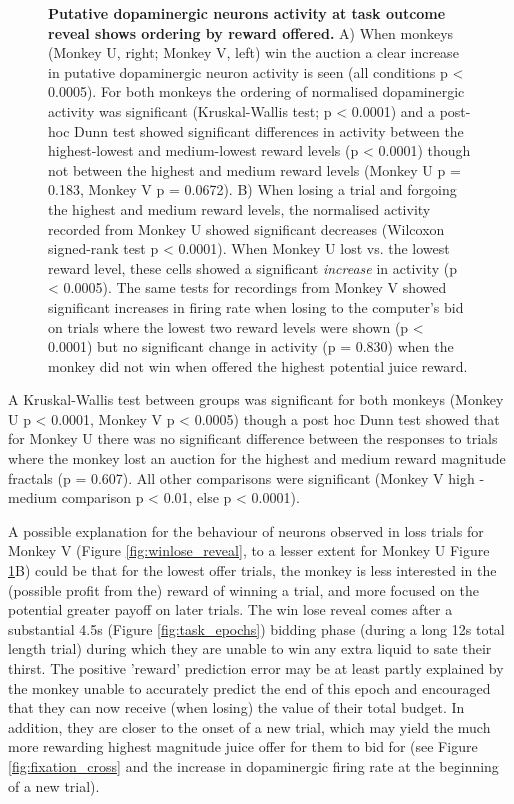 \begin{figure}[p] 
\centering    

\caption[Putative dopaminergic neurons activity at task outcome reveal shows ordering by reward offered.]{\textbf{Putative dopaminergic neurons activity at task outcome reveal shows ordering by reward offered.} A) When monkeys (Monkey U, right; Monkey V, left) win the auction a clear increase in putative dopaminergic neuron activity is seen (all conditions p < 0.0005). For both monkeys the ordering of normalised dopaminergic activity was significant (Kruskal-Wallis test; p < 0.0001) and a post-hoc Dunn test showed significant differences in activity between the highest-lowest and medium-lowest reward levels (p < 0.0001) though not between the highest and medium reward levels (Monkey U p = 0.183, Monkey V p = 0.0672). B) When losing a trial and forgoing the highest and medium reward levels, the normalised activity recorded from Monkey U showed significant decreases (Wilcoxon signed-rank test p < 0.0001). When Monkey U lost vs. the lowest reward level, these cells showed a significant \textit{increase} in activity (p < 0.0005). The same tests for recordings from Monkey V showed significant increases in firing rate when losing to the computer's bid on trials where the lowest two reward levels were shown (p < 0.0001) but no significant change in activity (p = 0.830) when the monkey did not win when offered the highest potential juice reward.}
\label{fig:winlose_reveal_by_fractal}
\end{figure}

A Kruskal-Wallis test between groups was significant for both monkeys (Monkey U p < 0.0001, Monkey V p < 0.0005) though a post hoc Dunn test showed that for Monkey U there was no significant difference between the responses to trials where the monkey lost an auction for the highest and medium reward magnitude fractals (p = 0.607). All other comparisons were significant (Monkey V high - medium comparison p < 0.01, else p < 0.0001).

A possible explanation for the behaviour of neurons observed in loss trials for Monkey V (Figure \ref{fig:winlose_reveal}, to a lesser extent for Monkey U Figure \ref{fig:winlose_reveal_by_fractal}B) could be that for the lowest offer trials, the monkey is less interested in the (possible profit from the) reward of winning a trial, and more focused on the potential greater payoff on later trials. The win lose reveal comes after a substantial 4.5s (Figure \ref{fig:task_epochs}) bidding phase (during a long 12s total length trial) during which they are unable to win any extra liquid to sate their thirst. The positive 'reward' prediction error may be at least partly explained by the monkey unable to accurately predict the end of this epoch and encouraged that they can now receive (when losing) the value of their total budget. In addition, they are closer to the onset of a new trial, which may yield the much more rewarding highest magnitude juice offer for them to bid for (see Figure \ref{fig:fixation_cross} and the increase in dopaminergic firing rate at the beginning of a new trial).

